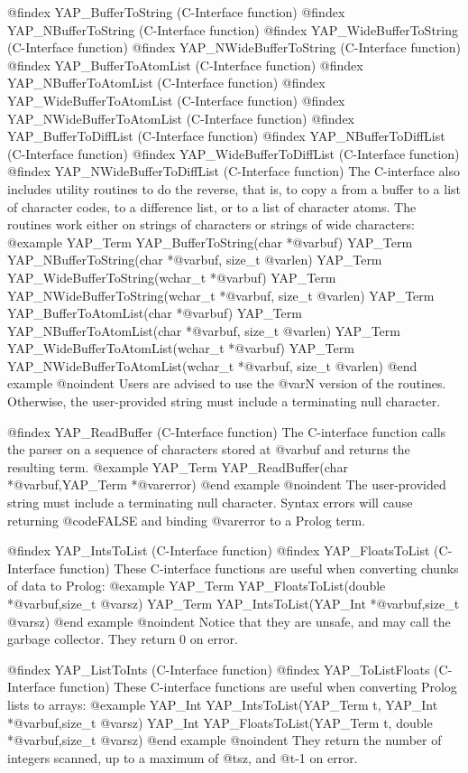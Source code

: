 {{{{{{{{@findex YAP_BufferToString (C-Interface function)
@findex YAP_NBufferToString (C-Interface function)
@findex YAP_WideBufferToString (C-Interface function)
@findex YAP_NWideBufferToString (C-Interface function)
@findex YAP_BufferToAtomList (C-Interface function)
@findex YAP_NBufferToAtomList (C-Interface function)
@findex YAP_WideBufferToAtomList (C-Interface function)
@findex YAP_NWideBufferToAtomList (C-Interface function)
@findex YAP_BufferToDiffList (C-Interface function)
@findex YAP_NBufferToDiffList (C-Interface function)
@findex YAP_WideBufferToDiffList (C-Interface function)
@findex YAP_NWideBufferToDiffList (C-Interface function)
The C-interface also includes utility routines to do the reverse, that
is, to copy a from a buffer to a list of character codes, to a
difference list,  or to a list of
character atoms. The routines work either on strings of characters or
strings of wide characters:
@example
      YAP_Term YAP_BufferToString(char *@var{buf})
      YAP_Term YAP_NBufferToString(char *@var{buf}, size_t @var{len})
      YAP_Term YAP_WideBufferToString(wchar_t *@var{buf})
      YAP_Term YAP_NWideBufferToString(wchar_t *@var{buf}, size_t @var{len})
      YAP_Term YAP_BufferToAtomList(char *@var{buf})
      YAP_Term YAP_NBufferToAtomList(char *@var{buf}, size_t @var{len})
      YAP_Term YAP_WideBufferToAtomList(wchar_t *@var{buf})
      YAP_Term YAP_NWideBufferToAtomList(wchar_t *@var{buf}, size_t @var{len})
@end example
@noindent
Users are advised to use the @var{N} version of the routines. Otherwise,
the user-provided string must include a terminating null character.

@findex YAP_ReadBuffer (C-Interface function)
The C-interface function calls the parser on a sequence of characters
stored at @var{buf} and returns the resulting term.
@example
      YAP_Term YAP_ReadBuffer(char *@var{buf},YAP_Term *@var{error})
@end example
@noindent
The user-provided string must include a terminating null
character. Syntax errors will cause returning @code{FALSE} and binding
@var{error} to a Prolog term.

@findex YAP_IntsToList (C-Interface function)
@findex YAP_FloatsToList (C-Interface function)
These C-interface functions are useful when converting chunks of data to Prolog:
@example
      YAP_Term YAP_FloatsToList(double *@var{buf},size_t @var{sz})
      YAP_Term YAP_IntsToList(YAP_Int *@var{buf},size_t @var{sz})
@end example
@noindent
Notice that they are unsafe, and may call the garbage collector. They
return 0 on error.

@findex YAP_ListToInts (C-Interface function)
@findex YAP_ToListFloats (C-Interface function)
These C-interface functions are useful when converting Prolog lists to arrays:
@example
      YAP_Int YAP_IntsToList(YAP_Term t, YAP_Int *@var{buf},size_t @var{sz})
      YAP_Int YAP_FloatsToList(YAP_Term t, double *@var{buf},size_t @var{sz})
@end example
@noindent
They return the number of integers scanned, up to a maximum of @t{sz},
and @t{-1} on error.

}}}}}}}}
